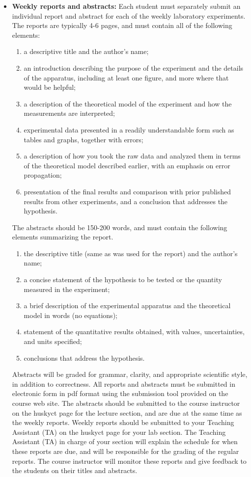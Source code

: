 \documentclass{revtex4}
\begin{document}
\begin{itemize}
\item
{\bf Weekly reports and abstracts:} Each student must separately submit an
individual report and abstract for each of the weekly laboratory experiments.
The reports are typically 4-6 pages, and must contain all of the following 
elements:
\begin{enumerate}
\item
a descriptive title and the author's name;
\item
an introduction describing the purpose of the experiment and the details of
the apparatus, including at least one figure, and more where that would be
helpful;
\item
a description of the theoretical model of the experiment and how the
measurements are interpreted;
\item
experimental data presented in a readily understandable form such as tables
and graphs, together with errors;
\item
a description of how you took the raw data and analyzed them in terms of the
theoretical model described earlier, with an emphasis on error propagation;
\item
presentation of the final results and comparison with prior published results
from other experiments, and a conclusion that addresses the hypothesis.
\end{enumerate}
The abstracts should be 150-200 words, and must contain the following elements
summarizing the report.
\begin{enumerate}
\item
the descriptive title (same as was used for the report) and the author's name;
\item
a concise statement of the hypothesis to be tested or the quantity measured
in the experiment;
\item
a brief description of the experimental apparatus and the theoretical model in 
words (no equations);
\item
statement of the quantitative results obtained, with values, uncertainties,
and units specified;
\item
conclusions that address the hypothesis.
\end{enumerate}
Abstracts will be graded for grammar, clarity, and appropriate scientific style,
in addition to correctness. All reports and abstracts must be submitted in
electronic form in pdf format using the submission tool provided on the course
web site. The abstracts should be submitted to the course instructor on the 
huskyct page for the lecture section, and are due at the same time as the weekly
reports. Weekly reports should be submitted to your Teaching Assistant (TA) on
the huskyct page for your lab section. The Teaching Assistant (TA) in charge of
your section will explain the schedule for when these reports are due, and will
be responsible for the grading of the regular reports. The course instructor
will monitor these reports and give feedback to the students on their titles
and abstracts.


\end{itemize}
\end{document}
